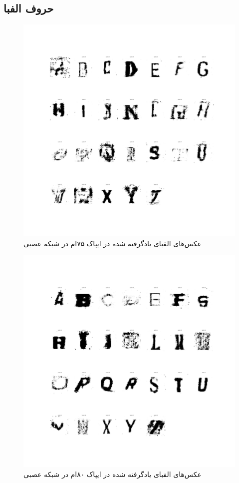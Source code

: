 \documentclass{article}
\begin{document}
\subsection{حروف الفبا}
\begin{figure}[H]
	\centerline{\includegraphics[width=\textwidth , height=\textheight ]{../results/CGAN_Adam/figs/Alphabet_(Epoch=75)}}
	\caption{عکس‌های الفبای یادگرفته شده در ایپاک ۷۵ام در شبکه عصبی}
\end{figure}
\begin{figure}[H]
	\centerline{\includegraphics[width=\textwidth , height=\textheight ]{../results/CGAN_Adam/figs/Alphabet_(Epoch=80)}}
	\caption{عکس‌های الفبای یادگرفته شده در ایپاک ۸۰ام در شبکه عصبی}
\end{figure}
\end{document}
